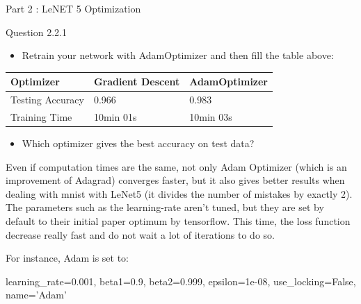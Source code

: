 \documentclass[11pt]{article}
\providecommand{\tightlist}{%
      \setlength{\itemsep}{0pt}\setlength{\parskip}{0pt}}
\newenvironment{Shaded}{}{}
\newcommand{\FloatTok}[1]{\textcolor[rgb]{0.25,0.63,0.44}{{#1}}}
\newcommand{\StringTok}[1]{\textcolor[rgb]{0.25,0.44,0.63}{{#1}}}
\newcommand{\NormalTok}[1]{{#1}}
\newcommand{\VariableTok}[1]{\textcolor[rgb]{0.10,0.09,0.49}{{#1}}}
\newcommand{\OperatorTok}[1]{\textcolor[rgb]{0.40,0.40,0.40}{{#1}}}
\begin{document}
     Part 2 : LeNET 5 Optimization

     Question 2.2.1

\begin{itemize}
\tightlist
\item
  Retrain your network with AdamOptimizer and then fill the table above:
\end{itemize}

\begin{longtable}[c]{@{}lll@{}}
\toprule
Optimizer & Gradient Descent & AdamOptimizer\tabularnewline
\midrule
\endhead
Testing Accuracy & 0.966 & 0.983\tabularnewline
Training Time & 10min 01s & 10min 03s\tabularnewline
\bottomrule
\end{longtable}

\begin{itemize}
\tightlist
\item
  Which optimizer gives the best accuracy on test data?
\end{itemize}

Even if computation times are the same, not only Adam Optimizer (which
is an improvement of Adagrad) converges faster, but it also gives better
results when dealing with mnist with LeNet5 (it divides the number of
mistakes by exactly 2). The parameters such as the learning-rate aren't
tuned, but they are set by default to their initial paper optimum by
tensorflow. This time, the loss function decrease really fast and do not
wait a lot of iterations to do so.

For instance, Adam is set to:

\begin{Shaded}
\begin{Highlighting}[]
    \NormalTok{learning_rate}\OperatorTok{=}\FloatTok{0.001}\NormalTok{,}
    \NormalTok{beta1}\OperatorTok{=}\FloatTok{0.9}\NormalTok{,}
    \NormalTok{beta2}\OperatorTok{=}\FloatTok{0.999}\NormalTok{,}
    \NormalTok{epsilon}\OperatorTok{=}\FloatTok{1e-08}\NormalTok{,}
    \NormalTok{use_locking}\OperatorTok{=}\VariableTok{False}\NormalTok{,}
    \NormalTok{name}\OperatorTok{=}\StringTok{'Adam'}
\end{Highlighting}
\end{Shaded}
\end{document}
